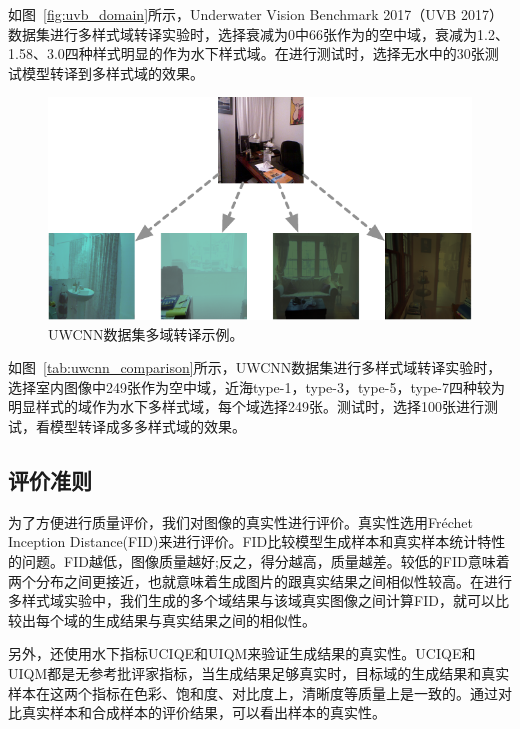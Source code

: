 如图~\ref{fig:uvb_domain}所示，Underwater Vision Benchmark 2017（UVB 2017）数据集进行多样式域转译实验时，选择衰减为0中66张作为的空中域，衰减为1.2、1.58、3.0四种样式明显的作为水下样式域。在进行测试时，选择无水中的30张测试模型转译到多样式域的效果。

\begin{figure}[ht]
    \centering
  \includegraphics[width=\textwidth]{figures/UWCNN_dataset_domain.pdf}
  \caption{UWCNN数据集多域转译示例。}
  \label{fig:uwcnn_domain}
\end{figure}

如图~\ref{tab:uwcnn_comparison}所示，UWCNN数据集进行多样式域转译实验时，选择室内图像中249张作为空中域，近海type-1，type-3，type-5，type-7四种较为明显样式的域作为水下多样式域，每个域选择249张。测试时，选择100张进行测试，看模型转译成多多样式域的效果。

\subsection{评价准则}
为了方便进行质量评价，我们对图像的真实性进行评价。真实性选用Fréchet Inception Distance(FID)来进行评价。FID比较模型生成样本和真实样本统计特性的问题。FID越低，图像质量越好;反之，得分越高，质量越差。较低的FID意味着两个分布之间更接近，也就意味着生成图片的跟真实结果之间相似性较高。在进行多样式域实验中，我们生成的多个域结果与该域真实图像之间计算FID，就可以比较出每个域的生成结果与真实结果之间的相似性。

另外，还使用水下指标UCIQE和UIQM来验证生成结果的真实性。UCIQE和UIQM都是无参考批评家指标，当生成结果足够真实时，目标域的生成结果和真实样本在这两个指标在色彩、饱和度、对比度上，清晰度等质量上是一致的。通过对比真实样本和合成样本的评价结果，可以看出样本的真实性。


